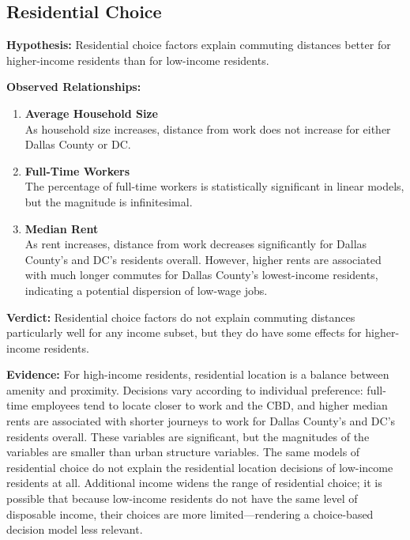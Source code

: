 \documentclass[paper=letter, fontsize=12pt]{scrartcl} %
\begin{document}
\subsection{Residential Choice}
\textbf{Hypothesis:} Residential choice factors explain commuting distances better for higher-income residents than for low-income residents.

\textbf{Observed Relationships:}
\begin{enumerate}
	\item \textbf{Average Household Size}\\
	As household size increases, distance from work does not increase for either Dallas County or DC.
	
	\item \textbf{Full-Time Workers}\\
	The percentage of full-time workers is statistically significant in linear models, but the magnitude is infinitesimal.
	
	\item \textbf{Median Rent}\\
	As rent increases, distance from work decreases significantly for Dallas County's and DC's residents overall. However, higher rents are associated with much longer commutes for Dallas County's lowest-income residents, indicating a potential dispersion of low-wage jobs.
\end{enumerate}

\textbf{Verdict:} Residential choice factors do not explain commuting distances particularly well for any income subset, but they do have some effects for higher-income residents.

\textbf{Evidence:} For high-income residents, residential location is a balance between amenity and proximity. Decisions vary according to individual preference: full-time employees tend to locate closer to work and the CBD, and higher median rents are associated with shorter journeys to work for Dallas County's and DC's residents overall. These variables are significant, but the magnitudes of the variables are smaller than urban structure variables. The same models of residential choice do not explain the residential location decisions of low-income residents at all. Additional income widens the range of residential choice; it is possible that because low-income residents do not have the same level of disposable income, their choices are more limited---rendering a choice-based decision model less relevant.\\
\end{document}

